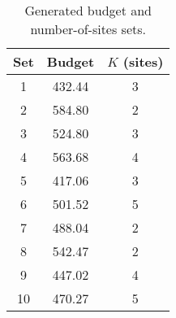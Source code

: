 \begin{table}[htbp]
\centering
\caption{Generated budget and number-of-sites sets.}
\label{tab:sa_budget_n_k}
\begin{tabular}{c|c|c}
\toprule
Set & Budget & $K$ (sites) \\
\midrule
1 & 432.44 & 3 \\
2 & 584.80 & 2 \\
3 & 524.80 & 3 \\
4 & 563.68 & 4 \\
5 & 417.06 & 3 \\
6 & 501.52 & 5 \\
7 & 488.04 & 2 \\
8 & 542.47 & 2 \\
9 & 447.02 & 4 \\
10 & 470.27 & 5 \\
\bottomrule
\end{tabular}
\end{table}
